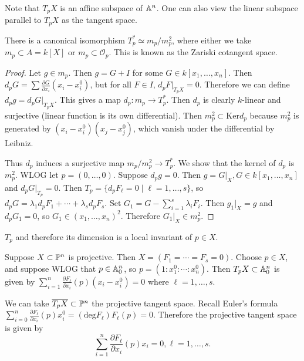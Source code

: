 \documentclass[twoside, 10pt]{article}
\begin{document}
    Note that $T_pX$ is an affine subspace of $\A^n$. One can also view the linear subspace parallel to $T_pX$ as the tangent space.

    \begin{thm}
        There is a canonical isomorphism $T_p^* \simeq m_p/m_p^2$, where either we take $m_p \subset A = k[X]$ or $m_p \subset \mathcal{O}_p$. This is known as the Zariski cotangent space.
        \begin{proof}
            Let $g \in m_p$. Then $g = G+I$ for some $G \in k[x_1, \ldots, x_n]$. Then $d_pG = \sum \frac{\partial G}{\partial x_i}(x_i - x_i^0)$, but for all $F \in I$, $d_pF|_{T_pX} = 0$. Therefore we can define $d_pg = d_pG|_{T_pX}$. This gives a map $d_p: m_p \to T_p^*$. Then $d_p$ is clearly $k$-linear and surjective (linear function is its own differential). Then $m_p^2 \subset \mathrm{Ker}d_p$ because $m_p^2$ is generated by $(x_i-x_i^0)(x_j-x_j^0)$, which vanish under the differential by Leibniz.

            Thus $d_p$ induces a surjective map $m_p/m_p^2 \to T_p^*$. We show that the kernel of $d_p$ is $m_p^2$. WLOG let $p = (0,\ldots, 0)$. Suppose $d_p g = 0$. Then $g = G|_X, G \in k[x_1, \ldots, x_n]$ and $d_pG|_{T_p} = 0$. Then $T_p = \{d_pF_{\ell} = 0 \mid \ell = 1, \ldots, s \}$, so $d_pG = \lambda_1 d_pF_1 + \cdots + \lambda_s d_p F_s$. Set $G_1 = G - \sum_{i=1}^s \lambda_i F_i$. Then $g_1|_X = g$ and $d_p G_1 = 0$, so $G_1 \in (x_1, \ldots, x_n)^2$. Therefore $G_1|_X \in m_p^2$.
        \end{proof}
    \end{thm}

    \begin{cor}
        $T_p$ and therefore its dimension is a local invariant of $p \in X$.
    \end{cor}

    \begin{rmk}
        Suppose $X \subset \P^n$ is projective. Then $X = (F_1 = \cdots = F_s = 0)$. Choose $p \in X$, and suppose WLOG that $p \in \A^n_0$, so $p = (1:x_1^0:\cdots:x_n^0)$. Then $T_p X \subset \A_0^n$ is given by $\sum_{i=1}^n \frac{\partial F_{\ell}}{\partial x_i}(p)(x_i - x_i^0) = 0$ where $\ell = 1, \ldots, s$.

        We can take $\overline{T_pX} \subset \P^n$ the projective tangent space. Recall Euler's formula $\sum_{i=0}^n \frac{\partial F_{\ell}}{\partial x_i}(p) x_i^0 = (\mathrm{deg}F_{\ell}) F_{\ell}(p) = 0$. Therefore the projective tangent space is given by \[ \sum_{i=1}^n \frac{\partial F_{\ell}}{\partial x_i}(p) x_i = 0, \ell = 1, \ldots, s. \]
    \end{rmk}
    
\end{document}

